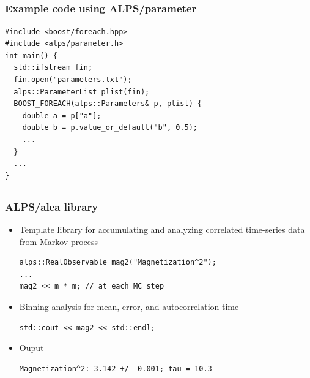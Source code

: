 \subsection*{\redm\whitem\greenb}
\begin{frame}[t,fragile]
  \frametitle{Example code using ALPS/parameter}
  \begin{lstlisting}
#include <boost/foreach.hpp>
#include <alps/parameter.h>
int main() {
  std::ifstream fin;
  fin.open("parameters.txt");
  alps::ParameterList plist(fin);
  BOOST_FOREACH(alps::Parameters& p, plist) {
    double a = p["a"];
    double b = p.value_or_default("b", 0.5);
    ...
  }
  ...
}
\end{lstlisting}
\end{frame}

\subsection*{\redm\whitem\greenb}
\begin{frame}[t,fragile]
  \frametitle{ALPS/alea library}
  \begin{itemize}
  \item Template library for accumulating and analyzing correlated time-series data from Markov process
    \begin{lstlisting}
alps::RealObservable mag2("Magnetization^2");
...
mag2 << m * m; // at each MC step
\end{lstlisting}
  \item Binning analysis for mean, error, and autocorrelation time
    \begin{lstlisting}
std::cout << mag2 << std::endl;
\end{lstlisting}
  \item Ouput
\begin{lstlisting}
Magnetization^2: 3.142 +/- 0.001; tau = 10.3
\end{lstlisting}
  \end{itemize}
\end{frame}

